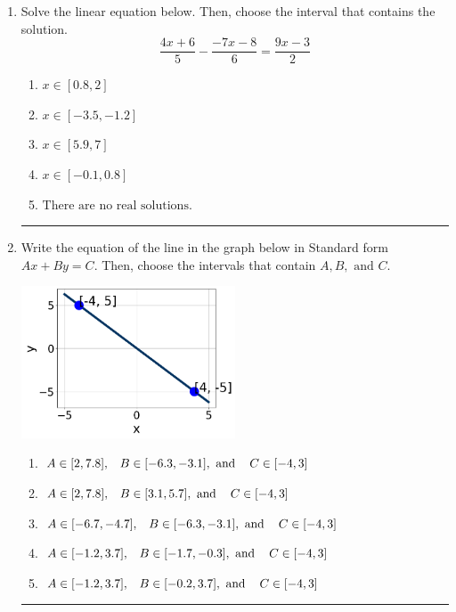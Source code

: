 \documentclass[14pt]{extbook}
\newcommand{\litem}[1]{\item#1\hspace*{-1cm}\rule{\textwidth}{0.4pt}}
\begin{document}
\begin{enumerate}
{\begin{enumerate}[label=\Alph*.]
\end{enumerate} }
\litem{
Solve the linear equation below. Then, choose the interval that contains the solution.\[ \frac{4x + 6}{5} - \frac{-7x -8}{6} = \frac{9x -3}{2} \]\begin{enumerate}[label=\Alph*.]
\item \( x \in [0.8, 2] \)
\item \( x \in [-3.5, -1.2] \)
\item \( x \in [5.9, 7] \)
\item \( x \in [-0.1, 0.8] \)
\item \( \text{There are no real solutions.} \)

\end{enumerate} }
\litem{
Write the equation of the line in the graph below in Standard form $Ax+By=C$. Then, choose the intervals that contain $A, B, \text{ and } C$.
\begin{center}
    \includegraphics[width=0.5\textwidth]{../Figures/linearGraphToStandardA.png}
\end{center}
\begin{enumerate}[label=\Alph*.]
\item \( A \in [2, 7.8], \hspace{3mm} B \in [-6.3, -3.1], \text{ and } \hspace{3mm} C \in [-4, 3] \)
\item \( A \in [2, 7.8], \hspace{3mm} B \in [3.1, 5.7], \text{ and } \hspace{3mm} C \in [-4, 3] \)
\item \( A \in [-6.7, -4.7], \hspace{3mm} B \in [-6.3, -3.1], \text{ and } \hspace{3mm} C \in [-4, 3] \)
\item \( A \in [-1.2, 3.7], \hspace{3mm} B \in [-1.7, -0.3], \text{ and } \hspace{3mm} C \in [-4, 3] \)
\item \( A \in [-1.2, 3.7], \hspace{3mm} B \in [-0.2, 3.7], \text{ and } \hspace{3mm} C \in [-4, 3] \)


\end{enumerate}}
\end{enumerate}
\end{document}
